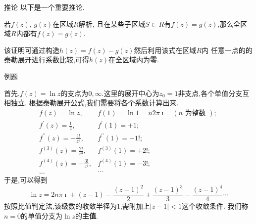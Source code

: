 \documentclass[fontset=windows, chinese, 10pt]{beamer}
\begin{document}
\begin{frame}{推论}
  \small
以下是一个重要推论.

若$f(z)$, $g(z)$在区域$R$解析,
且在某些子区域$S\subset R$有$f(z)=g(z)$,那么全区域$R$内都有$f(z)=g(z)$.

该证明可通过构造$h(z) = f(z) - g(z)$然后利用该式在区域$R$内
任意一点的的泰勒展开进行系数比较,可得$h(z)$在全区域内为零.
%
\end{frame}

\begin{frame}{例题}
  \small
  {
\begin{solution}
    首先,$f(z) = \ln z $的支点为$0,\infty$.这里的展开中心为$z_0=1$非支点,各个单值分支互相独立.
    根据泰勒展开公式,我们需要将各个系数计算出来.
    \[
        \begin{array}{ll}
            f(z)=\ln z, & f(1)=\ln 1=n 2 \pi \imath \quad(n \text { 为整数 }) \text {; } \\
            f^{\prime}(z)=\frac{1}{z}, & f^{\prime}(1)=+1 ; \\
            f^{\prime \prime}(z)=-\frac{1 !}{z^2}, & f^{\prime \prime}(1)=-1 ! ; \\
            f^{(3)}(z)=\frac{2 !}{z^3}, & f^{(3)}(1)=+2 ! ; \\
            f^{(4)}(z)=-\frac{3 !}{z^4}, & f^{(4)}(1)=-3 ! ; \\
            \ldots & \cdots
            \end{array}
    \]
    于是,可以得到
    \[
    \ln z = 2 n \pi \imath + (z-1) - \frac{(z-1)^2}{2} +  \frac{(z-1)^3}{3} -  \frac{(z-1)^4}{4} \cdots
    \]
    按照比值判定法,该级数的收敛半径为$1$,需附加上$|z-1|< 1$这个收敛条件.
    我们称$n=0$的单值分支为$\ln z $的\textbf{主值}.
\end{solution}
}
\end{frame}
\end{document}
